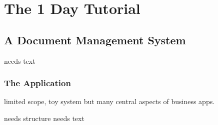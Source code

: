 \documentclass[a4paper,10pt,twoside]{book}
\begin{document}
  \sloppy
\fi


\chapter{The 1 Day Tutorial}

\section{A Document Management System}
needs text

\subsection{The Application}
limited scope, toy system but many central aspects of business apps. 

needs structure 
needs text

\ifx\wholebook\relax\else
   
   
\end{document}

